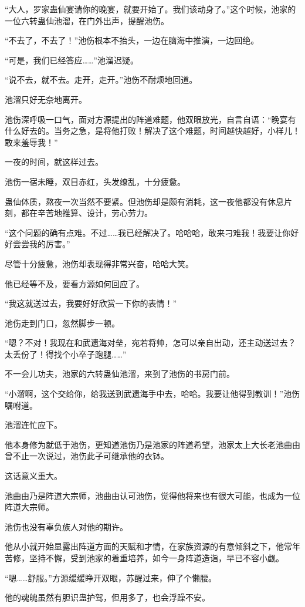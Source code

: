 \begin{this_body}
“大人，罗家蛊仙宴请你的晚宴，就要开始了。我们该动身了。”这个时候，池家的一位六转蛊仙池溜，在门外出声，提醒池伤。

“不去了，不去了！”池伤根本不抬头，一边在脑海中推演，一边回绝。

“可是，我们已经答应……”池溜迟疑。

“说不去，就不去。走开，走开。”池伤不耐烦地回道。

池溜只好无奈地离开。

池伤深呼吸一口气，面对方源提出的阵道难题，他双眼放光，自言自语：“晚宴有什么好去的。当务之急，是将他打败！解决了这个难题，时间越快越好，小样儿！敢来羞辱我！”

一夜的时间，就这样过去。

池伤一宿未睡，双目赤红，头发缭乱，十分疲惫。

蛊仙体质，熬夜一次当然不要紧。但池伤却是颇有消耗，这一夜他都没有休息片刻，都在辛苦地推算、设计，劳心劳力。

“这个问题的确有点难。不过……我已经解决了。哈哈哈，敢来刁难我！我要让你好好尝尝我的厉害。”

尽管十分疲惫，池伤却表现得非常兴奋，哈哈大笑。

他已经等不及，要看方源如何回应了。

“我这就送过去，我要好好欣赏一下你的表情！”

池伤走到门口，忽然脚步一顿。

“嗯？不对！我现在和武遗海对垒，宛若将帅，怎可以亲自出动，还主动送过去？太丢份了！得找个小卒子跑腿……”

不一会儿功夫，池家的六转蛊仙池溜，来到了池伤的书房门前。

“小溜啊，这个交给你，给我送到武遗海手中去，哈哈。我要让他得到教训！”池伤嘱咐道。

池溜连忙应下。

他本身修为就低于池伤，更知道池伤乃是池家的阵道希望，池家太上大长老池曲由曾不止一次说过，池伤此子可继承他的衣钵。

这话意义重大。

池曲由乃是阵道大宗师，池曲由认可池伤，觉得他将来也有很大可能，也成为一位阵道大宗师。

池伤也没有辜负族人对他的期许。

他从小就开始显露出阵道方面的天赋和才情，在家族资源的有意倾斜之下，他常年苦修，坚持不懈，受到池家的着重培养，如今一身阵道造诣，早已不容小觑。

“嗯……舒服。”方源缓缓睁开双眼，苏醒过来，伸了个懒腰。

他的魂魄虽然有胆识蛊护驾，但用多了，也会浮躁不安。


\end{this_body}
